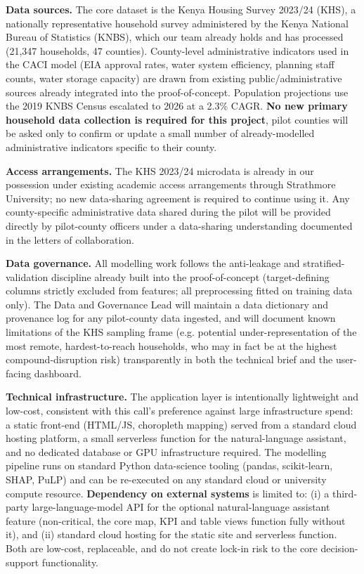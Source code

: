 \documentclass[12pt,a4paper]{article}
\begin{document}
\textbf{Data sources.} The core dataset is the Kenya Housing Survey 2023/24 (KHS), a nationally representative household survey administered by the Kenya National Bureau of Statistics (KNBS), which our team already holds and has processed (21,347 households, 47 counties). County-level administrative indicators used in the CACI model (EIA approval rates, water system efficiency, planning staff counts, water storage capacity) are drawn from existing public/administrative sources already integrated into the proof-of-concept. Population projections use the 2019 KNBS Census escalated to 2026 at a 2.3\% CAGR. \textbf{No new primary household data collection is required for this project}, pilot counties will be asked only to confirm or update a small number of already-modelled administrative indicators specific to their county.

\textbf{Access arrangements.} The KHS 2023/24 microdata is already in our possession under existing academic access arrangements through Strathmore University; no new data-sharing agreement is required to continue using it. Any county-specific administrative data shared during the pilot will be provided directly by pilot-county officers under a data-sharing understanding documented in the letters of collaboration.

\textbf{Data governance.} All modelling work follows the anti-leakage and stratified-validation discipline already built into the proof-of-concept (target-defining columns strictly excluded from features; all preprocessing fitted on training data only). The Data and Governance Lead will maintain a data dictionary and provenance log for any pilot-county data ingested, and will document known limitations of the KHS sampling frame (e.g. potential under-representation of the most remote, hardest-to-reach households, who may in fact be at the highest compound-disruption risk) transparently in both the technical brief and the user-facing dashboard.

\textbf{Technical infrastructure.} The application layer is intentionally lightweight and low-cost, consistent with this call's preference against large infrastructure spend: a static front-end (HTML/JS, choropleth mapping) served from a standard cloud hosting platform, a small serverless function for the natural-language assistant, and no dedicated database or GPU infrastructure required. The modelling pipeline runs on standard Python data-science tooling (pandas, scikit-learn, SHAP, PuLP) and can be re-executed on any standard cloud or university compute resource. \textbf{Dependency on external systems} is limited to: (i) a third-party large-language-model API for the optional natural-language assistant feature (non-critical, the core map, KPI and table views function fully without it), and (ii) standard cloud hosting for the static site and serverless function. Both are low-cost, replaceable, and do not create lock-in risk to the core decision-support functionality.
\end{document}
